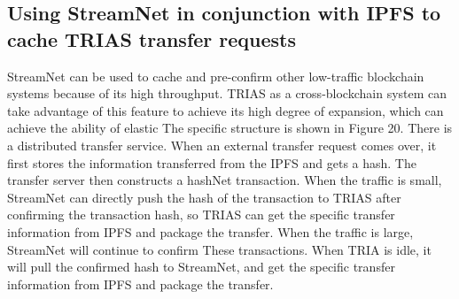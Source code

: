 \subsection{Using StreamNet in conjunction with IPFS to cache TRIAS transfer requests}
StreamNet can be used to cache and pre-confirm other low-traffic blockchain systems because of its high throughput. TRIAS as a cross-blockchain system can take advantage of this feature to achieve its high degree of expansion, which can achieve the ability of elastic The specific structure is shown in Figure 20. There is a distributed transfer service. When an external transfer request comes over, it first stores the information transferred from the IPFS and gets a hash. The transfer server then constructs a hashNet transaction. When the traffic is small, StreamNet can directly push the hash of the transaction to TRIAS after confirming the transaction hash, so TRIAS can get the specific transfer information from IPFS and package the transfer. When the traffic is large, StreamNet will continue to confirm These transactions. When TRIA is idle, it will pull the confirmed hash to StreamNet, and get the specific transfer information from IPFS and package the transfer.

